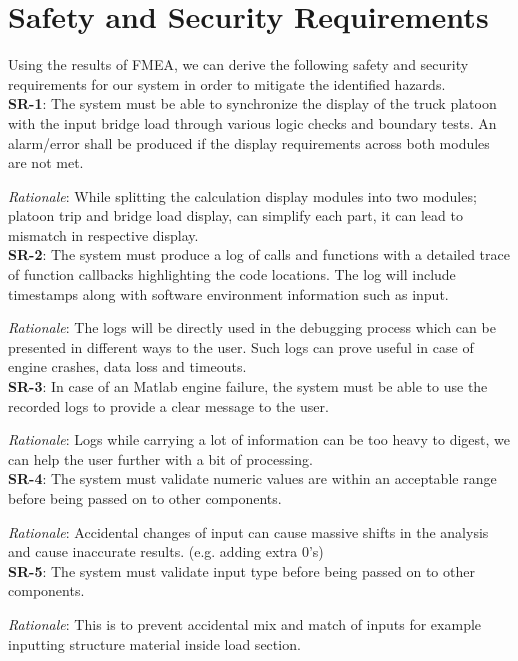 \documentclass{article}
\begin{document}
\newpage

\section{Safety and Security Requirements}
Using the results of FMEA, we can derive the following safety and security requirements for our system in order to mitigate the identified hazards. \\

\textbf{SR-1}:
The system must be able to synchronize the display of the truck platoon with the input bridge load through various logic checks and boundary tests. An alarm/error shall be produced if the display requirements across both modules are not met. 

\emph{Rationale}: While splitting the calculation display modules into two modules; platoon trip and bridge load display, can simplify each part, it can lead to mismatch in respective display.\\

\textbf{SR-2}: 
The system must produce a log of calls and functions with a detailed trace of function callbacks highlighting the code locations. The log will include timestamps along with software environment information such as input.

\emph{Rationale}:
The logs will be directly used in the debugging process which can be presented in different ways to the user. Such logs can prove useful in case of engine crashes, data loss and timeouts. \\

\textbf{SR-3}:
In case of an Matlab engine failure, the system must be able to use the recorded logs to provide a clear message to the user.

\emph{Rationale}: Logs while carrying a lot of information can be too heavy to digest, we can help the user further with a bit of processing.\\ 

\textbf{SR-4}:
The system must validate numeric values are within an acceptable range before being passed on to other components.

\emph{Rationale}: Accidental changes of input can cause massive shifts in the analysis and cause inaccurate results. (e.g. adding extra 0’s) \\

\textbf{SR-5}:
The system must validate input type before being passed on to other components.

\emph{Rationale}: This is to prevent accidental mix and match of inputs for example inputting structure material inside load section.\\
\end{document}
